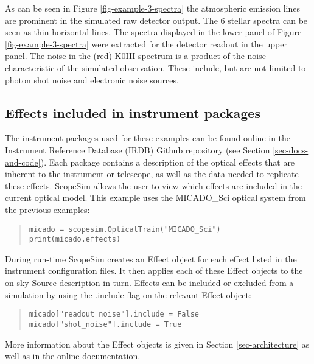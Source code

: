 As can be seen in Figure \ref{fig-example-3-spectra} the atmospheric emission lines are prominent in the simulated raw detector output.
The 6 stellar spectra can be seen as thin horizontal lines.
The spectra displayed in the lower panel of Figure \ref{fig-example-3-spectra} were extracted for the detector readout in the upper panel.
The noise in the (red) K0III spectrum is a product of the noise characteristic of the simulated observation.
These include, but are not limited to photon shot noise and electronic noise sources.


\subsection{Effects included in instrument packages%
  \label{effects-included-in-instrument-packages}%
}

The instrument packages used for these examples can be found online in the Instrument Reference Database (IRDB) Github repository (see Section \ref{sec-docs-and-code}).
Each package contains a description of the optical effects that are inherent to the instrument or telescope, as well as the data needed to replicate these effects.
ScopeSim allows the user to view which effects are included in the current optical model.
This example uses the MICADO\_Sci optical system from the previous examples:

\begin{quote}
\begin{alltt}
\begin{lstlisting}[frame=single]
micado = scopesim.OpticalTrain("MICADO_Sci")
print(micado.effects)
\end{lstlisting}
\end{alltt}
\end{quote}

During run-time ScopeSim creates an Effect object for each effect listed in the instrument configuration files.
It then applies each of these Effect objects to the on-sky Source description in turn.
Effects can be included or excluded from a simulation by using the \textquotedbl{}.include\textquotedbl{} flag on the relevant Effect object:

\begin{quote}
\begin{alltt}
\begin{lstlisting}[frame=single]
micado["readout_noise"].include = False
micado["shot_noise"].include = True
\end{lstlisting}
\end{alltt}
\end{quote}

More information about the Effect objects is given in Section \ref{sec-architecture} as well as in the online documentation.
